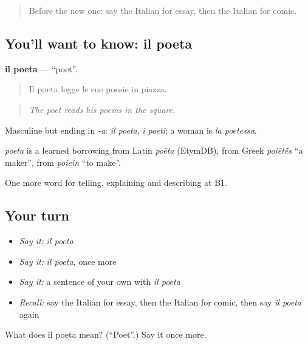 \label{lesson:IT-C527-poeta}



\begin{quote}
Before the new one: say the Italian for essay, then the Italian for comic.
\end{quote}

\subsection*{You'll want to know: il poeta}
\textbf{il poeta} — \textquotedblleft{}poet\textquotedblright{}.

\begin{quote}
Il poeta legge le sue poesie in piazza.
\end{quote}

\begin{quote}
\emph{The poet reads his poems in the square.}
\end{quote}

Masculine but ending in \emph{-a}: \emph{il poeta}, \emph{i poeti}; a woman is \emph{la poetessa}.

\begin{cousinweb}
\emph{poeta} is a learned borrowing from Latin \emph{poēta} (EtymDB), from Greek \emph{poiēt\'{\={e}}s} \textquotedblleft{}a maker\textquotedblright{}, from \emph{poieîn} \textquotedblleft{}to make\textquotedblright{}.
\end{cousinweb}

\begin{grammarlens}[title={What you've built}]
One more word for telling, explaining and describing at B1.
\end{grammarlens}

\subsection*{Your turn}
\begin{itemize}
\raggedright
  \item \emph{Say it:} \emph{il poeta}
  \item \emph{Say it:} \emph{il poeta}, once more
  \item \emph{Say it:} a sentence of your own with \emph{il poeta}
  \item \emph{Recall:} say the Italian for essay, then the Italian for comic, then say \emph{il poeta} again
\end{itemize}

\begin{tcolorbox}[breakable,colback=teal!4,colframe=teal!35!black,title={Before you move on}]
What does il poeta mean? (\textquotedblleft{}Poet\textquotedblright{}.) Say it once more.
\end{tcolorbox}
